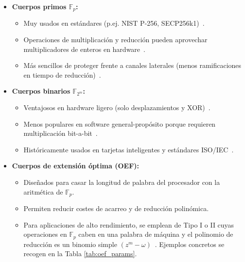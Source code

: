 \begin{itemize}
  \item \textbf{Cuerpos primos \(\mathbb{F}_p\):}  
    \begin{itemize}
      \item Muy usados en estándares (p.ej. NIST P-256, SECP256k1)~\citep{nist-fips186-4}.
      \item Operaciones de multiplicación y reducción pueden aprovechar multiplicadores de enteros en hardware~\citep{hankerson2004guide}.  
      \item Más sencillos de proteger frente a canales laterales (menos ramificaciones en tiempo de reducción)~\citep{kocher1999dpa}.
    \end{itemize}
  \item \textbf{Cuerpos binarios \(\mathbb{F}_{2^m}\):}  
    \begin{itemize}
      \item Ventajosos en hardware ligero (solo desplazamientos y XOR)~\citep{sec2-v2}.
      \item Menos populares en software general-propósito porque requieren multiplicación bit-a-bit~\citep{hankerson2004guide}.  
      \item Históricamente usados en tarjetas inteligentes y estándares ISO/IEC~\citep{sec2-v2}.  
    \end{itemize}
  \item \textbf{Cuerpos de extensión óptima (OEF):}  
    \begin{itemize}
      \item Diseñados para casar la longitud de palabra del procesador con la aritmética de \(\mathbb{F}_p\).  
      \item Permiten reducir costes de acarreo y de reducción polinómica.  
      \item Para aplicaciones de alto rendimiento, se emplean de Tipo I o II cuyas operaciones en \(\mathbb{F}_p\) caben en una palabra de máquina y el polinomio de reducción es un binomio simple \((z^m-\omega)\)~\citep{militzer2004oef,barreto2003oef}. Ejemplos concretos se recogen en la Tabla \ref{tab:oef_params}.
    \end{itemize}
\end{itemize}


